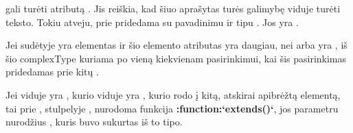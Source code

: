 \documentclass[letterpaper,10pt,lithuanian]{sphinxmanual}
\begin{document}
\sphinxAtStartPar
{\hyperref[\detokenize{schemos/xsd:xsd-complextype}]{}} gali turėti atributą . Jis reiškia, kad šiuo {\hyperref[\detokenize{schemos/xsd:xsd-complextype}]{}}
aprašytas {\hyperref[\detokenize{schemos/xsd:xsd-element}]{}} turės galimybę viduje turėti teksto. Tokiu atveju, prie {\hyperref[\detokenize{formatas:model}]{}}
pridedama {\hyperref[\detokenize{formatas:property}]{}} su pavadinimu  ir tipu . Jos {\hyperref[\detokenize{dimensijos:property.source}]{}} yra .

\sphinxAtStartPar
Jei  sudėtyje yra {\hyperref[\detokenize{schemos/xsd:xsd-choice}]{}} elementas ir šio elemento atributas {\hyperref[\detokenize{schemos/xsd:xsd-maxoccurs}]{}}
yra daugiau, nei  arba yra , iš šio complexType kuriama po vieną {\hyperref[\detokenize{formatas:model}]{}} kiekvienam
{\hyperref[\detokenize{schemos/xsd:xsd-choice}]{}} pasirinkimui, kai šis pasirinkimas pridedamas prie kitų {\hyperref[\detokenize{dimensijos:property}]{}}.

\sphinxAtStartPar
Jei  viduje yra , kurio viduje yra , kurio {\hyperref[\detokenize{dimensijos:base}]{}}
rodo į kitą, atskirai apibrėžtą elementą, tai prie {\hyperref[\detokenize{formatas:model}]{}}, stulpelyje , nurodoma
funkcija {\color{red}\bfseries{}:function:`extends()`}, jos parametru nurodžius {\hyperref[\detokenize{formatas:model}]{}}, kuris buvo sukurtas iš to tipo.
\end{document}
